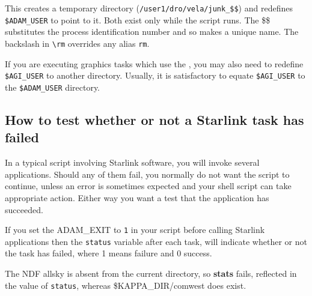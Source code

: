 \documentclass[twoside,11pt,nolof]{starlink}
\begin{document}
This creates a temporary directory (\texttt{/user1/dro/vela/junk\_\$\$})
and redefines \texttt{\$ADAM\_USER} to point to it.  Both exist only while the
script runs.  The \$\$ substitutes the process identification number
and so makes a unique name.  The backslash in \verb+\rm+ overrides
any alias \texttt{rm}.

If you are executing graphics tasks which use the , you may also need to redefine {\tt
\$AGI\_USER} to another directory.  Usually, it is satisfactory to
equate \texttt{\$AGI\_USER} to the \texttt{\$ADAM\_USER} directory.

\subsection{How to test whether or not a
Starlink task has failed}\label{sc4_se_exit_status}

In a typical script involving Starlink software, you will invoke
several applications.  Should any of them fail, you normally do not
want the script to continue, unless an error is sometimes expected and
your shell script can take appropriate action.  Either way you want a
test that the application has succeeded.

If you set the ADAM\_EXIT  to \texttt{1} in your script before calling
Starlink applications then the \texttt{status} variable after each task,
will indicate whether or not the task has failed, where 1 means
failure and 0 success.

\begin{small}
\end{small}

The NDF allsky is absent from the current directory, so \textbf{stats}
fails, reflected in the value of \texttt{status}, whereas
\$KAPPA\_DIR/comwest does exist.
\end{document}
